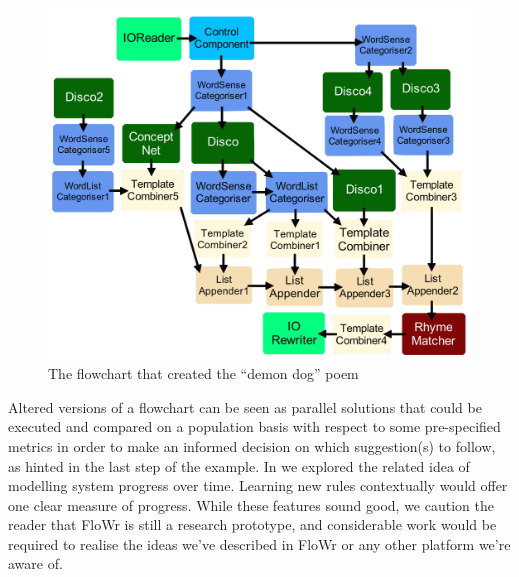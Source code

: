 \begin{figure}[t]
\begin{center}
\includegraphics[width=\columnwidth]{./figures/PoemsFlowchart.png}
\caption{The flowchart that created the ``demon dog'' poem}
\label{poetryGeneratorFlowchart}
\end{center}
\end{figure}

Altered versions of a flowchart \cite{charnley2014flowr} can be seen as parallel solutions that could be executed and compared on a population basis with respect to some pre-specified metrics in order to make an informed decision on which suggestion(s) to follow, as hinted in the last step of the example.  In \cite{colton-assessingprogress} we explored the related idea of modelling system progress over time.  Learning new rules contextually would offer one clear measure of progress.  While these features sound good, we caution the reader that FloWr is still a research prototype, and considerable work would be required to realise the ideas we've described in FloWr or any other platform we're aware of.

